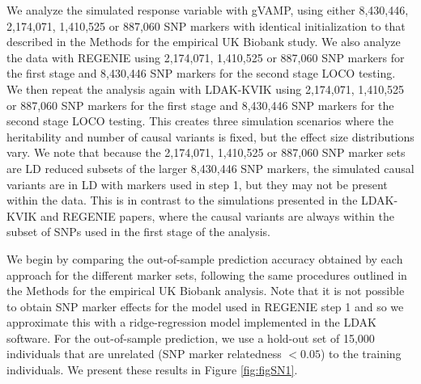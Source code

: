 We analyze the simulated response variable with gVAMP, using either 8,430,446, 2,174,071, 1,410,525 or 887,060 SNP markers with identical initialization to that described in the Methods for the empirical UK Biobank study. We also analyze the data with REGENIE using 2,174,071, 1,410,525 or 887,060 SNP markers for the first stage and 8,430,446 SNP markers for the second stage LOCO testing. We then repeat the analysis again with LDAK-KVIK using 2,174,071, 1,410,525 or 887,060 SNP markers for the first stage and 8,430,446 SNP markers for the second stage LOCO testing. This creates three simulation scenarios where the heritability and number of causal variants is fixed, but the effect size distributions vary. We note that because the 2,174,071, 1,410,525 or 887,060 SNP marker sets are LD reduced subsets of the larger 8,430,446 SNP markers, the simulated causal variants are in LD with markers used in step 1, but they may not be present within the data. This is in contrast to the simulations presented in the LDAK-KVIK\cite{hof2024ldak} and REGENIE\cite{regenie} papers, where the causal variants are always within the subset of SNPs used in the first stage of the analysis.

We begin by comparing the out-of-sample prediction accuracy obtained by each approach for the different marker sets, following the same procedures outlined in the Methods for the empirical UK Biobank analysis. Note that it is not possible to obtain SNP marker effects for the model used in REGENIE step 1 and so we approximate this with a ridge-regression model implemented in the LDAK software. For the out-of-sample prediction, we use a hold-out set of 15,000 individuals that are unrelated (SNP marker relatedness $<0.05$) to the training individuals. We present these results in Figure \ref{fig:figSN1}. 

